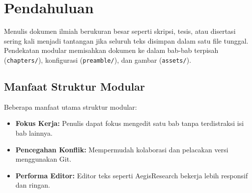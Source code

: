 \section{Pendahuluan}
\label{sec:pendahuluan}
Menulis dokumen ilmiah berukuran besar seperti skripsi, tesis, atau disertasi sering kali menjadi tantangan jika seluruh teks disimpan dalam satu file tunggal. Pendekatan modular memisahkan dokumen ke dalam bab-bab terpisah (\texttt{chapters/}), konfigurasi (\texttt{preamble/}), dan gambar (\texttt{assets/}).

\subsection{Manfaat Struktur Modular}
Beberapa manfaat utama struktur modular:
\begin{itemize}
    \item \textbf{Fokus Kerja:} Penulis dapat fokus mengedit satu bab tanpa terdistraksi isi bab lainnya.
    \item \textbf{Pencegahan Konflik:} Mempermudah kolaborasi dan pelacakan versi menggunakan Git.
    \item \textbf{Performa Editor:} Editor teks seperti AegisResearch bekerja lebih responsif dan ringan.
\end{itemize}
